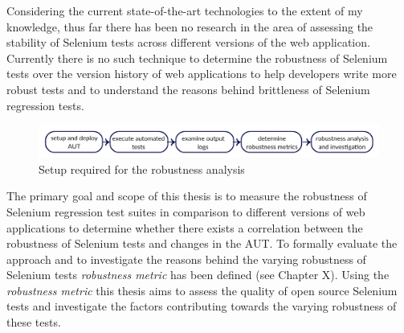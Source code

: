 Considering the current state-of-the-art technologies to the extent of my knowledge, thus far there has been no research in the area of assessing the stability of Selenium tests across different versions of the web application. Currently there is no such technique to determine the robustness of Selenium tests over the version history of web applications to help developers write more robust tests and to understand the reasons behind brittleness of Selenium regression tests. 
\begin{figure}
	\centering	\includegraphics[width=\textwidth]{./Figures/thesisoverviewsmall.jpg}
	\caption{Setup required for the robustness analysis}
	\label{fig:thesisoverview}
\end{figure} 
The primary goal and scope of this thesis is to measure the robustness of Selenium regression test suites in comparison to different versions of web applications to determine whether there exists a correlation between the robustness of Selenium tests and changes in the AUT. To formally evaluate the approach and to investigate the reasons behind the varying robustness of Selenium tests \textit{robustness metric} has been defined (see Chapter X). Using the \textit{robustness metric} this thesis aims to assess the quality of open source Selenium tests and investigate the factors contributing towards the varying robustness of these tests.
 

